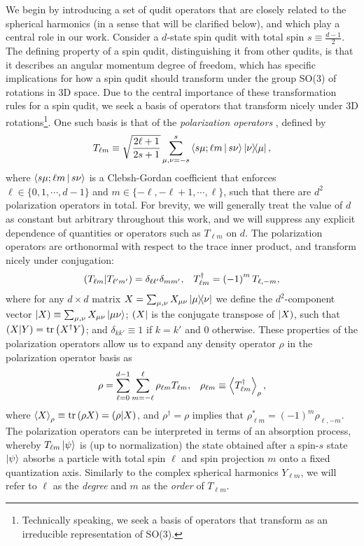 \documentclass[a4paper,twocolumn,unpublished]{quantumarticle}
\newcommand{\f}[2]{\dfrac{#1}{#2}} %
\newcommand{\p}[1]{\left(#1\right)} %
\newcommand{\bk}{\Braket} %
\renewcommand{\set}[1]{\{#1\}} %
\def\obra#1{\mathinner{({#1}|}}
\def\oket#1{\mathinner{|{#1})}}
\def\obk#1{\mathinner{({#1})}}
\begin{document}
We begin by introducing a set of qudit operators that are closely related to the spherical harmonics (in a sense that will be clarified below), and which play a central role in our work.
Consider a $d$-state spin qudit with total spin $s\equiv\frac{d-1}{2}$.
The defining property of a spin qudit, distinguishing it from other qudits, is that it describes an angular momentum degree of freedom, which has specific implications for how a spin qudit should transform under the group SO(3) of rotations in 3D space.
Due to the central importance of these transformation rules for a spin qudit, we seek a basis of operators that transform nicely under 3D rotations\footnote{Technically speaking, we seek a basis of operators that transform as an irreducible representation of SO(3).}.
One such basis is that of the {\it polarization operators} \cite{kryszewski2006positivity, bertlmann2008bloch}, defined by
\begin{align}
  T_{\ell m} \equiv \sqrt{\f{2\ell+1}{2s+1}} \sum_{\mu,\nu=-s}^s
  \bk{s\mu;\ell m|s\nu} \op{\nu}{\mu},
  \label{eq:trans_op}
\end{align}
where $\bk{s\mu;\ell m|s\nu}$ is a Clebsh-Gordan coefficient that enforces $\ell\in\set{0,1,\cdots,d-1}$ and $m\in\set{-\ell,-\ell+1,\cdots,\ell}$, such that there are $d^2$ polarization operators in total.
For brevity, we will generally treat the value of $d$ as constant but arbitrary throughout this work, and we will suppress any explicit dependence of quantities or operators such as $T_{\ell m}$ on $d$.
The polarization operators are orthonormal with respect to the trace inner product, and transform nicely under conjugation:
\begin{align}
  \obk{T_{\ell m }|T_{\ell'm'}}
  = \delta_{\ell\ell'} \delta_{mm'},
  &&
  T_{\ell m}^\dag = \p{-1}^m T_{\ell,-m},
\end{align}
where for any $d\times d$ matrix $X=\sum_{\mu,\nu} X_{\mu\nu} \op{\mu}{\nu}$ we define the $d^2$-component vector $\oket{X} \equiv \sum_{\mu,\nu} X_{\mu\nu} \ket{\mu\nu}$; $\obra{X}$ is the conjugate transpose of $\oket{X}$, such that $\obk{X|Y}=\tr\p{X^\dag Y}$; and $\delta_{kk'}\equiv 1$ if $k=k'$ and $0$ otherwise.
These properties of the polarization operators allow us to expand any density operator $\rho$ in the polarization operator basis as
\begin{align}
  \rho = \sum_{\ell=0}^{d-1} \sum_{m=-\ell}^\ell
  \rho_{\ell m} T_{\ell m},
  &&
  \rho_{\ell m} \equiv \bk{T_{\ell m}^\dag}_\rho,
  \label{eq:trans_state}
\end{align}
where $\bk{X}_\rho\equiv\tr\p{\rho X}=\obk{\rho|X}$, and $\rho^\dag=\rho$ implies that $\rho_{\ell m}^*=\p{-1}^m\rho_{\ell,-m}$.
The polarization operators can be interpreted in terms of an absorption process, whereby $T_{\ell m}\ket\psi$ is (up to normalization) the state obtained after a spin-$s$ state $\ket\psi$ absorbs a particle with total spin $\ell$ and spin projection $m$ onto a fixed quantization axis.
Similarly to the complex spherical harmonics $Y_{\ell m}$, we will refer to $\ell$ as the {\it degree} and $m$ as the {\it order} of $T_{\ell m}$.
\end{document}
